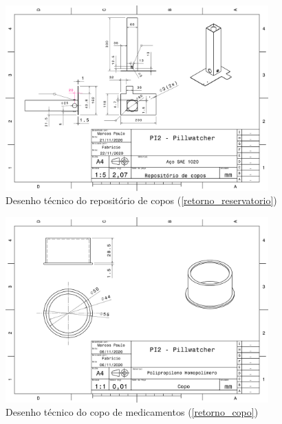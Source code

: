 \begin{apendicesenv}
\begin{figure}[H]
    \centering
    \includegraphics[width=0.9\textwidth]{figuras/estrutura/Desenhos/Reservatorio_V2.pdf}
    \caption{Desenho técnico do repositório de copos (\ref{retorno_reservatorio})}
    \label{fig:repositorio}
\end{figure}

\begin{figure}[H]
    \centering
    \includegraphics[width=0.9\textwidth]{figuras/estrutura/Desenhos/Copo.pdf}
    \caption{Desenho técnico do copo de medicamentos (\ref{retorno_copo})}
    \label{fig:copo}
\end{figure}


\end{apendicesenv}
